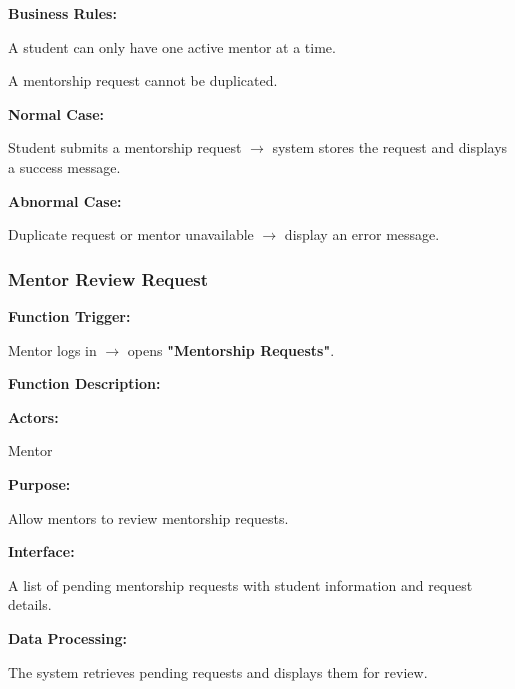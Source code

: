 \textbf{Business Rules:}

A student can only have one active mentor at a time.

A mentorship request cannot be duplicated.

\textbf{Normal Case:}

Student submits a mentorship request $\rightarrow$ system stores the request and displays a success message.

\textbf{Abnormal Case:}

Duplicate request or mentor unavailable $\rightarrow$ display an error message.

%

\subsubsection{Mentor Review Request}

\textbf{Function Trigger:}

Mentor logs in $\rightarrow$ opens \textbf{"Mentorship Requests"}.

\vspace{0.3cm}

\textbf{Function Description:}

\textbf{Actors:}

Mentor

\vspace{0.2cm}

\textbf{Purpose:}

Allow mentors to review mentorship requests.

\vspace{0.2cm}

\textbf{Interface:}

A list of pending mentorship requests with student information and request details.

\vspace{0.2cm}

\textbf{Data Processing:}

The system retrieves pending requests and displays them for review.


